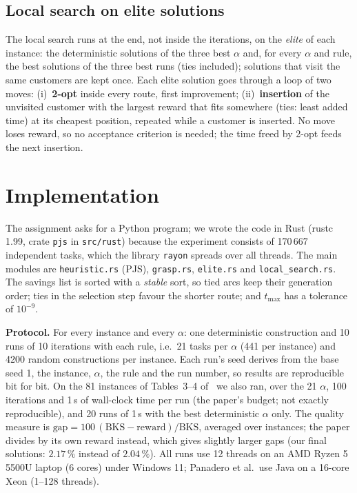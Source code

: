 \documentclass[10pt,a4paper]{article}
\begin{document}
\subsection{Local search on elite solutions}

The local search runs at the end, not inside the iterations, on the \emph{elite} of each instance: the
deterministic solutions of the three best $\alpha$ and, for every $\alpha$ and rule, the best solutions
of the three best runs (ties included); solutions that visit the same customers are kept once. Each
elite solution goes through a loop of two moves: (i)~\textbf{2-opt} inside every route, first improvement;
(ii)~\textbf{insertion} of the unvisited customer with the largest reward that fits somewhere (ties:
least added time) at its cheapest position, repeated while a customer is inserted. No move loses
reward, so no acceptance criterion is needed; the time freed by 2-opt feeds the next insertion.

\section{Implementation}
\label{sec:impl}

The assignment asks for a Python program; we wrote the code in Rust (rustc 1.99, crate
\texttt{pjs} in \texttt{src/rust}) because the experiment consists of 170\,667 independent tasks, which
the library \texttt{rayon} spreads over all threads. The main modules are \texttt{heuristic.rs} (PJS), \texttt{grasp.rs},
\texttt{elite.rs} and \texttt{local\_search.rs}. The savings list is sorted with a \emph{stable} sort,
so tied arcs keep their generation order; ties in the selection step favour the shorter route; and
$t_{\max}$ has a tolerance of $10^{-9}$.

\textbf{Protocol.} For every instance and every $\alpha$: one deterministic construction and 10 runs of
10 iterations with each rule, i.e.\ 21 tasks per $\alpha$ (441 per instance) and 4200 random
constructions per instance. Each run's seed
derives from the base seed 1, the instance, $\alpha$, the rule and the run number, so results are
reproducible bit for bit. On the 81 instances of
Tables~3--4 of~\cite{panadero2021} we also ran, over the 21 $\alpha$, 100 iterations and 1\,s of wall-clock time per run (the
paper's budget; not exactly reproducible), and 20 runs of 1\,s with the best deterministic $\alpha$ only.
The quality measure is $\text{gap}=100\,(\text{BKS}-\text{reward})/\text{BKS}$, averaged over instances; the
paper divides by its own reward instead, which gives slightly larger gaps (our final solutions: $2.17\,\%$
instead of $2.04\,\%$). All runs use 12
threads on an AMD Ryzen 5 5500U laptop (6 cores) under Windows 11; Panadero et al.\ use Java on a 16-core
Xeon (1--128 threads).
\end{document}
